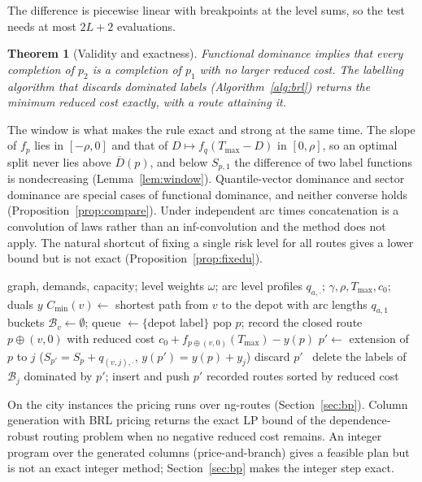 \documentclass[preprint,11pt]{elsarticle}
\newtheorem{theorem}{Theorem}
\theoremstyle{definition}
\theoremstyle{remark}
\newcommand{\Dh}{\overline{D}}
\begin{document}
The difference is piecewise linear with breakpoints at the level sums, so the test needs at most $2L+2$ evaluations.

\begin{theorem}[Validity and exactness]\label{thm:fdom}
Functional dominance implies that every completion of $p_2$ is a completion of $p_1$ with no larger reduced cost. The labelling algorithm that discards dominated labels (Algorithm~\ref{alg:brl}) returns the minimum reduced cost exactly, with a route attaining it.
\end{theorem}

The window is what makes the rule exact and strong at the same time. The slope of $f_p$ lies in $[-\rho,0]$ and that of $D\mapsto f_q(T_{\max}-D)$ in $[0,\rho]$, so an optimal split never lies above $\Dh(p)$, and below $S_{p,1}$ the difference of two label functions is nondecreasing (Lemma~\ref{lem:window}). Quantile-vector dominance and sector dominance are special cases of functional dominance, and neither converse holds (Proposition~\ref{prop:compare}). Under independent arc times concatenation is a convolution of laws rather than an inf-convolution and the method does not apply. The natural shortcut of fixing a single risk level for all routes gives a lower bound but is not exact (Proposition~\ref{prop:fixedu}).

\begin{algorithm}[t]
\caption{BRL pricing for the dependence-robust routing problem ($H=1$)}\label{alg:brl}
\begin{algorithmic}[1]
\Require graph, demands, capacity; level weights $\omega$; arc level profiles $q_{a,\cdot}$; $\gamma,\rho,T_{\max},c_0$; duals $y$
\State $C_{\min}(v)\gets$ shortest path from $v$ to the depot with arc lengths $q_{a,1}$
\State buckets $\mathcal B_v\gets\emptyset$; queue $\gets\{$depot label$\}$
  \State pop $p$; record the closed route $p\oplus(v,0)$ with reduced cost $c_0+f_{p\oplus(v,0)}(T_{\max})-y(p)$
    \State $p'\gets$ extension of $p$ to $j$ ($S_{p'}=S_p+q_{(v,j),\cdot}$, $y(p')=y(p)+y_j$)
     discard $p'$
    \Else\ delete the labels of $\mathcal B_j$ dominated by $p'$; insert and push $p'$
    \EndIf
  \EndFor
\EndWhile
\State \Return recorded routes sorted by reduced cost
\end{algorithmic}
\end{algorithm}

On the city instances the pricing runs over ng-routes (Section~\ref{sec:bp}). Column generation \citep{Feillet2004,Irnich2005} with BRL pricing returns the exact LP bound of the dependence-robust routing problem when no negative reduced cost remains. An integer program over the generated columns (price-and-branch) gives a feasible plan but is not an exact integer method; Section~\ref{sec:bp} makes the integer step exact.
\end{document}

